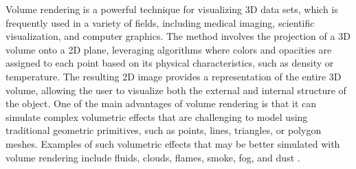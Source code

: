 Volume rendering is a powerful technique for visualizing 3D data sets, which is frequently used in a variety of fields, including medical imaging, scientific visualization, and computer graphics. The method involves the projection of a 3D volume onto a 2D plane, leveraging algorithms where colors and opacities are assigned to each point based on its physical characteristics, such as density or temperature. The resulting 2D image provides a representation of the entire 3D volume, allowing the user to visualize both the external and internal structure of the object. One of the main advantages of volume rendering is that it can simulate complex volumetric effects that are challenging to model using traditional geometric primitives, such as points, lines, triangles, or polygon meshes. Examples of such volumetric effects that may be better simulated with volume rendering include fluids, clouds, flames, smoke, fog, and dust \cite{max_optical_1995}.




